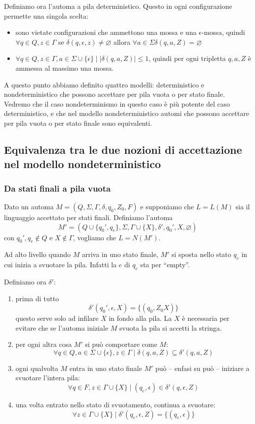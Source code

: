 \documentclass[12pt]{report}
\begin{document}
Definiamo ora l'automa a pila deterministico.
Questo in ogni configurazione permette una singola scelta:
\begin{itemize}
	\item sono vietate configurazioni che ammettono una mossa e una $\epsilon$-mossa, quindi $\forall q \in Q, z \in \Gamma$ se $\delta(q, \epsilon, z) \neq \varnothing$ allora $\forall a \in \Sigma \delta(q, a, Z) = \varnothing$
	\item $\forall q \in Q, z \in \Gamma, a \in \Sigma \cup \{\epsilon\} \mid |\delta(q, a, Z)|\leq 1$, quindi per ogni tripletta $q, a, Z$ è ammessa al massimo una mossa.
\end{itemize}
A questo punto abbiamo definito quattro modelli: deterministico e nondeterministico che possono accettare per pila vuota o per stato finale.
Vedremo che il caso nondeterminismo in questo caso è più potente del caso deterministico, e che nel modello nondeterministico automi che possono accettare per pila vuota o per stato finale sono equivalenti.

\subsection{Equivalenza tra le due nozioni di accettazione nel modello nondeterministico}
\subsubsection{Da stati finali a pila vuota}
Dato un automa $M = (Q, \Sigma, \Gamma, \delta, q_0, Z_0, F)$ e supponiamo che $L = L(M)$ sia il linguaggio accettato per stati finali.
Definiamo l'automa 
$$M' = (Q \cup \{q_0', q_e\}, \Sigma, \Gamma \cup \{X\}, \delta', q_0', X, \varnothing)$$
con $q_0', q_e \not \in Q$ e $X \not \in \Gamma$, vogliamo che $L= N(M')$.

Ad alto livello quando $M$ arriva in uno stato finale, $M'$ si sposta nello stato $q_e$ in cui inizia a svuotare la pila.
Infatti la $e$ di $q_e$ sta per ``empty''.

Definiamo ora $\delta'$:
\begin{enumerate}
	\item prima di tutto 
		$$ \delta'(q_0', \epsilon, X) = \{(q_0, Z_0X)\} $$
		questo serve solo ad infilare $X$ in fondo alla pila.
		La $X$ è necessaria per evitare che se l'automa iniziale $M$ svuota la pila si accetti la stringa.
	\item per ogni altra cosa $M'$ si può comportare come $M$:
		$$ \forall q \in Q, a \in \Sigma \cup \{\epsilon\}, z \in \Gamma \mid \delta(q, a, Z) \subseteq \delta'(q, a, Z) $$
	\item ogni qualvolta $M$ entra in uno stato finale $M'$ può -- enfasi su può -- iniziare a svuotare l'intera pila:
		$$ \forall q \in F, z \in \Gamma \cup \{X\} \mid (q_e, \epsilon) \in \delta'(q, \epsilon, Z) $$
	\item una volta entrato nello stato di svuotamento, continua a svuotare:
		$$ \forall z \in \Gamma \cup \{X\} \mid \delta'(q_e, \epsilon, Z) = \{(q_e, \epsilon)\}$$ 
\end{enumerate}
\end{document}
